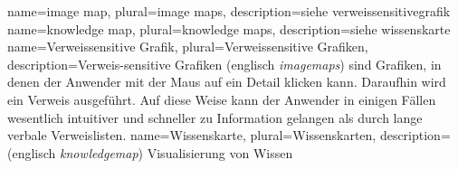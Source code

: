 {
	name=image map,
	plural=image maps,
	description={siehe \gls{verweissensitivegrafik}}
}
{
	name=knowledge map,
	plural=knowledge maps,
	description={siehe \gls{wissenskarte}}
}
{
	name=Verweissensitive Grafik,
	plural=Verweissensitive Grafiken,
	description={Verweis-sensitive Grafiken (englisch \textit{\glspl{imagemap}}) sind Grafiken, in denen der Anwender mit der Maus auf ein Detail klicken kann. Daraufhin wird ein Verweis ausgeführt. Auf diese Weise kann der Anwender in einigen Fällen wesentlich intuitiver und schneller zu Information gelangen als durch lange verbale Verweislisten.}
}
{
	name=Wissenskarte,
	plural=Wissenskarten,
	description={(englisch \textit{\gls{knowledgemap}}) Visualisierung von Wissen}
}








%
%

